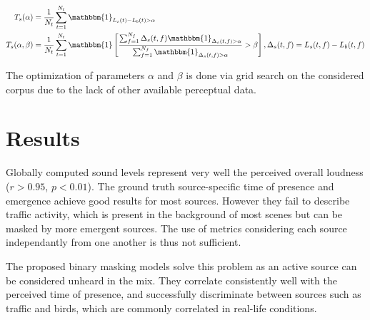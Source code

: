 \documentclass[a0,portrait]{a0poster}
\begin{document}
\begin{multicols}{2}
\begin{align}
T_s(\alpha) &= \frac{1}{N_t}\sum_{t = 1}^{N_t}\mathbbm{1}_{L_s(t) - L_b(t)>\alpha} \\
T_s(\alpha, \beta) &= \frac{1}{N_t}\sum_{t = 1}^{N_t}\mathbbm{1}\left[ \frac{\sum_{f = 1}^{N_f}\Delta_s(t, f)\mathbbm{1}_{\Delta_s(t, f)>\alpha}}{\sum_{f = 1}^{N_f}\mathbbm{1}_{\Delta_s(t, f)>\alpha}}>\beta \right], \Delta_s(t, f) = L_s(t, f) - L_b(t, f)
\end{align}

The optimization of parameters $\alpha$ and $\beta$ is done via grid search on the considered corpus due to the lack of other available perceptual data.

\section*{Results}

Globally computed sound levels represent very well the perceived overall loudness ($r>0.95$, $p<0.01$). The ground truth source-specific time of presence and emergence achieve good results for most sources. However they fail to describe traffic activity, which is present in the background of most scenes but can be masked by more emergent sources. The use of metrics considering each source independantly from one another is thus not sufficient.

The proposed binary masking models solve this problem as an active source can be considered unheard in the mix. They correlate consistently well with the perceived time of presence, and successfully discriminate between sources such as traffic and birds, which are commonly correlated in real-life conditions.


\end{multicols}
\end{document}
